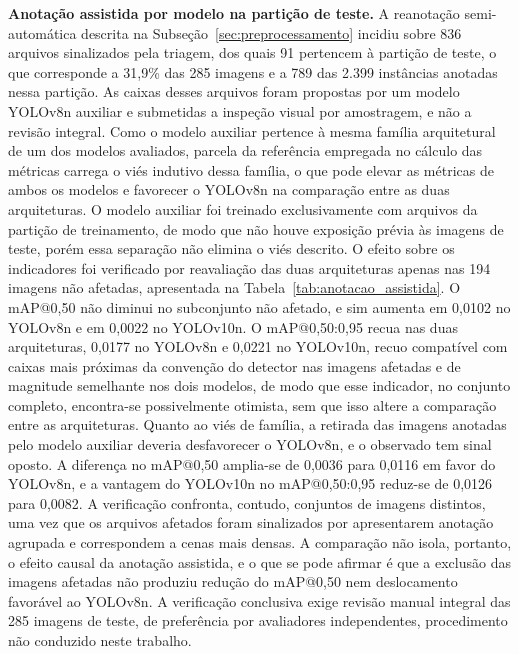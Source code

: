 \documentclass[artigo,times,capa]{iftex2024}
\begin{document}
\textbf{Anotação assistida por modelo na partição de teste.} A reanotação semi-automática descrita na Subseção~\ref{sec:preprocessamento} incidiu sobre 836 arquivos sinalizados pela triagem, dos quais 91 pertencem à partição de teste, o que corresponde a 31,9\% das 285 imagens e a 789 das 2.399 instâncias anotadas nessa partição. As caixas desses arquivos foram propostas por um modelo YOLOv8n auxiliar e submetidas a inspeção visual por amostragem, e não a revisão integral. Como o modelo auxiliar pertence à mesma família arquitetural de um dos modelos avaliados, parcela da referência empregada no cálculo das métricas carrega o viés indutivo dessa família, o que pode elevar as métricas de ambos os modelos e favorecer o YOLOv8n na comparação entre as duas arquiteturas. O modelo auxiliar foi treinado exclusivamente com arquivos da partição de treinamento, de modo que não houve exposição prévia às imagens de teste, porém essa separação não elimina o viés descrito. O efeito sobre os indicadores foi verificado por reavaliação das duas arquiteturas apenas nas 194 imagens não afetadas, apresentada na Tabela~\ref{tab:anotacao_assistida}. O \ac{mAP}@0,50 não diminui no subconjunto não afetado, e sim aumenta em 0,0102 no YOLOv8n e em 0,0022 no YOLOv10n. O \ac{mAP}@0,50:0,95 recua nas duas arquiteturas, 0,0177 no YOLOv8n e 0,0221 no YOLOv10n, recuo compatível com caixas mais próximas da convenção do detector nas imagens afetadas e de magnitude semelhante nos dois modelos, de modo que esse indicador, no conjunto completo, encontra-se possivelmente otimista, sem que isso altere a comparação entre as arquiteturas. Quanto ao viés de família, a retirada das imagens anotadas pelo modelo auxiliar deveria desfavorecer o YOLOv8n, e o observado tem sinal oposto. A diferença no \ac{mAP}@0,50 amplia-se de 0,0036 para 0,0116 em favor do YOLOv8n, e a vantagem do YOLOv10n no \ac{mAP}@0,50:0,95 reduz-se de 0,0126 para 0,0082. A verificação confronta, contudo, conjuntos de imagens distintos, uma vez que os arquivos afetados foram sinalizados por apresentarem anotação agrupada e correspondem a cenas mais densas. A comparação não isola, portanto, o efeito causal da anotação assistida, e o que se pode afirmar é que a exclusão das imagens afetadas não produziu redução do \ac{mAP}@0,50 nem deslocamento favorável ao YOLOv8n. A verificação conclusiva exige revisão manual integral das 285 imagens de teste, de preferência por avaliadores independentes, procedimento não conduzido neste trabalho.


\end{document}
